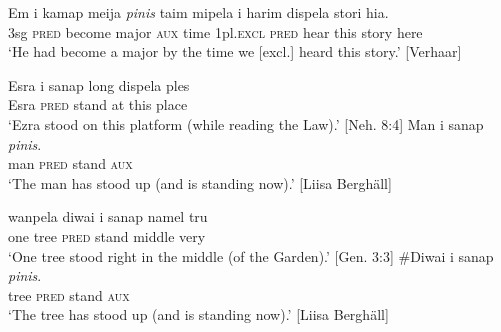 \ea
\gll  Em  i  kamap  meija  \textit{pinis}  taim  mipela  i  harim  dispela  stori  hia.\\
3sg  \textsc{pred}  become  major  \textsc{aux}  time  1pl.\textsc{excl}  \textsc{pred}  hear  this  story  here\\
\glt ‘He had become a major by the time we [excl.] heard this story.’  [Verhaar]
\z

\ea
\ea \gll  Esra  i  sanap  long  dispela  ples\\
Esra  \textsc{pred}  stand  at  this  place\\
\glt ‘Ezra stood on this platform (while reading the Law).’  [Neh. 8:4]
\ex \gll  Man  i  sanap  \textit{pinis}.\\
man  \textsc{pred}  stand  \textsc{aux}\\
\glt ‘The man has stood up (and is standing now).’  [Liisa Berghäll]
\z \z

\ea
\ea \gll wanpela  diwai  i  sanap  namel  tru\\
one  tree  \textsc{pred}  stand  middle  very\\
\glt ‘One tree stood right in the middle (of the Garden).’  [Gen. 3:3]
\ex \gll  \#Diwai  i  sanap  \textit{pinis}.\\
  tree  \textsc{pred}  stand  \textsc{aux}\\
\glt ‘The tree has stood up (and is standing now).’  [Liisa Berghäll]
\z \z



